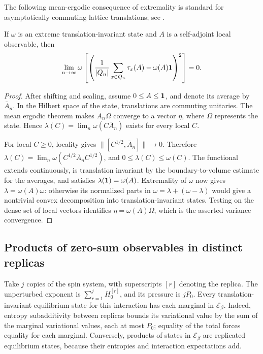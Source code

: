 The following mean-ergodic consequence of extremality is standard for
asymptotically commuting lattice translations; see
\cite[Theorem~3]{KastlerRobinson1966}.

\begin{lemma}\label{lem:ergodic-variance}
If $\omega$ is an extreme translation-invariant state and $A$ is a
self-adjoint local observable, then
\[
 \lim_{n\to\infty}
 \omega\left[\left(
      \frac1{|Q_n|}\sum_{x\in Q_n}\tau_x(A)-\omega(A)\mathbf1
                   \right)^2\right]=0.
\]
\end{lemma}

\begin{proof}
After shifting and scaling, assume $0\le A\le\mathbf1$, and denote its
average by $\bar A_n$.  In the Hilbert space of the state, translations
are commuting unitaries.  The mean ergodic theorem makes
$\bar A_n\Omega$ converge to a vector $\eta$, where $\Omega$ represents
the state.  Hence $\lambda(C)=\lim_n\omega(C\bar A_n)$ exists for every
local $C$.

For local $C\ge0$, locality gives
$\|[C^{1/2},\bar A_n]\|\to0$.  Therefore
$\lambda(C)=\lim_n\omega(C^{1/2}\bar A_nC^{1/2})$, and
$0\le\lambda(C)\le\omega(C)$.  The functional extends continuously,
is translation invariant by the boundary-to-volume estimate for the
averages, and satisfies $\lambda(\mathbf1)=\omega(A)$.  Extremality of
$\omega$ now gives $\lambda=\omega(A)\omega$: otherwise its normalized
parts in $\omega=\lambda+(\omega-\lambda)$ would give a nontrivial
convex decomposition into translation-invariant states.  Testing on
the dense set of local vectors identifies $\eta=\omega(A)\Omega$,
which is the asserted variance convergence.
\end{proof}

\subsection{Products of zero-sum observables in distinct replicas}

Take $j$ copies of the spin system, with superscripts $[r]$ denoting
the replica.  The unperturbed exponent is
$\sum_{r=1}^jH_0^{[r]}$, and its pressure is $jP_0$.  Every
translation-invariant equilibrium state for this interaction has each
marginal in $\mathcal E_\beta$.  Indeed, entropy subadditivity between
replicas bounds its variational value by the sum of the marginal
variational values, each at most $P_0$; equality of the total forces
equality for each marginal.  Conversely, products of states in
$\mathcal E_\beta$ are replicated equilibrium states, because their
entropies and interaction expectations add.

